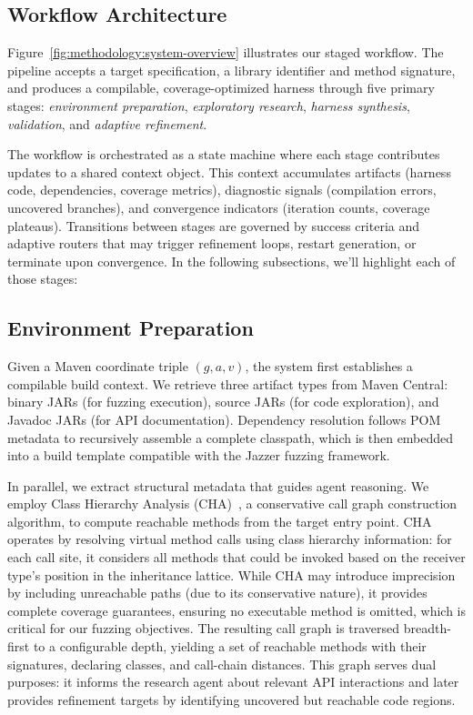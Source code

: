 \documentclass[sigconf,review,anonymous]{acmart}
\begin{document}
\subsection{Workflow Architecture}

Figure~\ref{fig:methodology:system-overview} illustrates our staged workflow. The pipeline accepts a target specification, a library identifier and method signature, and produces a compilable, coverage-optimized harness through five primary stages: \emph{environment preparation}, \emph{exploratory research}, \emph{harness synthesis}, \emph{validation}, and \emph{adaptive refinement}.

The workflow is orchestrated as a state machine where each stage contributes updates to a shared context object. This context accumulates artifacts (harness code, dependencies, coverage metrics), diagnostic signals (compilation errors, uncovered branches), and convergence indicators (iteration counts, coverage plateaus). Transitions between stages are governed by success criteria and adaptive routers that may trigger refinement loops, restart generation, or terminate upon convergence. In the following subsections, we'll highlight each of those stages:

\subsection{Environment Preparation}

Given a Maven coordinate triple $(g, a, v)$, the system first establishes a compilable build context. We retrieve three artifact types from Maven Central: binary JARs (for fuzzing execution), source JARs (for code exploration), and Javadoc JARs (for API documentation). Dependency resolution follows POM metadata to recursively assemble a complete classpath, which is then embedded into a build template compatible with the Jazzer fuzzing framework.

In parallel, we extract structural metadata that guides agent reasoning. We employ Class Hierarchy Analysis (CHA)~\cite{DBLP:conf/ecoop/DeanGC95}, a conservative call graph construction algorithm, to compute reachable methods from the target entry point. CHA operates by resolving virtual method calls using class hierarchy information: for each call site, it considers all methods that could be invoked based on the receiver type's position in the inheritance lattice. While CHA may introduce imprecision by including unreachable paths (due to its conservative nature), it provides complete coverage guarantees, ensuring no executable method is omitted, which is critical for our fuzzing objectives. The resulting call graph is traversed breadth-first to a configurable depth, yielding a set of reachable methods with their signatures, declaring classes, and call-chain distances. This graph serves dual purposes: it informs the research agent about relevant API interactions and later provides refinement targets by identifying uncovered but reachable code regions.
\end{document}
